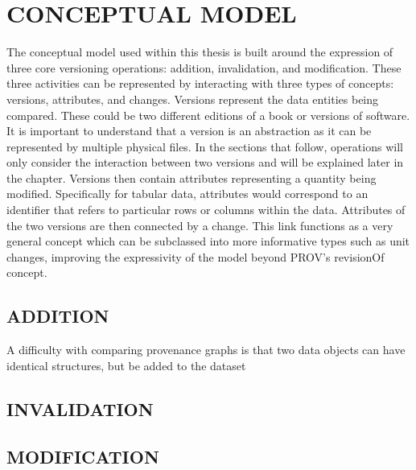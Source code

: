 
\chapter{CONCEPTUAL MODEL}

The conceptual model used within this thesis is built around the expression of three core versioning operations: addition, invalidation, and modification.  These three activities can be represented by interacting with three types of concepts: versions, attributes, and changes.  Versions represent the data entities being compared.  These could be two different editions of a book or versions of software.  It is important to understand that a version is an abstraction as it can be represented by multiple physical files.  In the sections that follow, operations will only consider the interaction between two versions and will be explained later in the chapter.  Versions then contain attributes representing a quantity being modified.  Specifically for tabular data, attributes would correspond to an identifier that refers to particular rows or columns within the data.  Attributes of the two versions are then connected by a change.  This link functions as a very general concept which can be subclassed into more informative types such as unit changes, improving the expressivity of the model beyond PROV's revisionOf concept.

\section{ADDITION}

A difficulty with comparing provenance graphs is that two data objects can have identical structures, but be added to the dataset 

\section{INVALIDATION}

\section{MODIFICATION}

